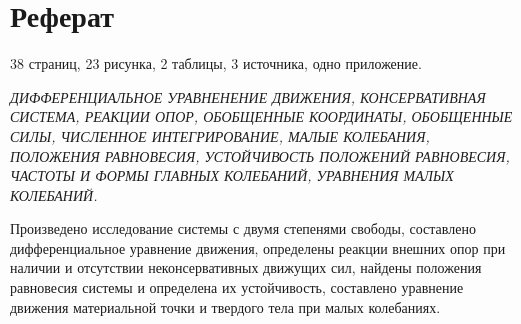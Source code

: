 \section*{Реферат}
38 страниц, 23 рисунка, 2 таблицы, 3 источника, одно приложение. 

\hspace{1pt}

\textit{ДИФФЕРЕНЦИАЛЬНОЕ УРАВНЕНЕНИЕ ДВИЖЕНИЯ, КОНСЕРВАТИВНАЯ СИСТЕМА, РЕАКЦИИ ОПОР, ОБОБЩЕННЫЕ КООРДИНАТЫ, ОБОБЩЕННЫЕ СИЛЫ, ЧИСЛЕННОЕ ИНТЕГРИРОВАНИЕ, МАЛЫЕ КОЛЕБАНИЯ, ПОЛОЖЕНИЯ РАВНОВЕСИЯ, УСТОЙЧИВОСТЬ ПОЛОЖЕНИЙ РАВНОВЕСИЯ, ЧАСТОТЫ И ФОРМЫ ГЛАВНЫХ КОЛЕБАНИЙ, УРАВНЕНИЯ МАЛЫХ КОЛЕБАНИЙ.}

\hspace{1pt}

Произведено исследование системы с двумя степенями свободы, составлено дифференциальное уравнение движения, определены реакции внешних опор при наличии и отсутствии неконсервативных движущих сил, найдены положения равновесия системы и определена их устойчивость, составлено уравнение движения материальной точки и твердого тела при малых колебаниях.